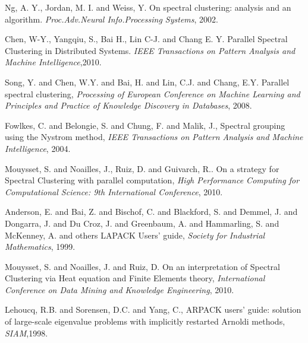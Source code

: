 \documentclass{llncs}
\begin{document}
\begin{thebibliography}{5}
%
Ng, A. Y., Jordan, M. I.  and Weiss, Y.
On spectral clustering: analysis and an algorithm.
\emph{Proc.Adv.Neural Info.Processing Systems}, 2002.


Chen, W-Y., Yangqiu, S., Bai H., Lin C-J. and Chang E. Y.
Parallel Spectral Clustering in Distributed Systems.
\emph{IEEE Transactions on Pattern Analysis and Machine Intelligence},2010.


%



Song, Y. and Chen, W.Y. and Bai, H. and Lin, C.J. and Chang, E.Y.
Parallel spectral clustering,
\emph{Processing of European Conference on Machine Learning and Principles and Practice of Knowledge Discovery in Databases}, 2008.

  Fowlkes, C. and Belongie, S. and Chung, F. and Malik, J.,
  Spectral grouping using the Nystrom method,
\emph{IEEE Transactions on Pattern Analysis and Machine Intelligence}, 2004.


Mouysset, S. and Noailles, J., Ruiz, D. and Guivarch, R..
On a strategy for Spectral Clustering with parallel computation,
\emph{High Performance Computing for Computational Science: 9th International Conference}, 2010.


Anderson, E. and Bai, Z. and Bischof, C. and Blackford, S. and Demmel, J. and Dongarra, J. and Du Croz, J. and Greenbaum, A. and Hammarling, S. and McKenney, A. and others
LAPACK Users' guide,
 \emph{Society for Industrial Mathematics}, 1999.


Mouysset, S. and Noailles, J. and Ruiz, D.
On an interpretation of Spectral Clustering via Heat equation and Finite Elements theory,
\emph{International Conference on Data Mining and Knowledge Engineering}, 2010.



Lehoucq, R.B. and Sorensen, D.C. and Yang, C.,
 ARPACK users' guide: solution of large-scale eigenvalue problems with implicitly restarted Arnoldi methods,
\emph{SIAM},1998. 

%
\end{thebibliography}
\end{document}
